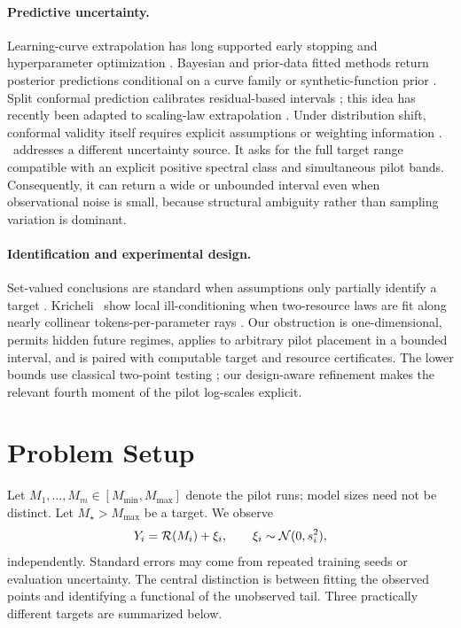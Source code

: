 \paragraph{Predictive uncertainty.}
Learning-curve extrapolation has long supported early stopping and hyperparameter optimization \citep{domhan2015speeding,klein2017fast}. Bayesian and prior-data fitted methods return posterior predictions conditional on a curve family or synthetic-function prior \citep{adriaensen2023efficient,lee2025bayesian}. Split conformal prediction calibrates residual-based intervals \citep{romano2019conformalized}; this idea has recently been adapted to scaling-law extrapolation \citep{bukkapatnam2026conformalized}. Under distribution shift, conformal validity itself requires explicit assumptions or weighting information \citep{tibshirani2019covariate}. \ScaleCert\ addresses a different uncertainty source. It asks for the full target range compatible with an explicit positive spectral class and simultaneous pilot bands. Consequently, it can return a wide or unbounded interval even when observational noise is small, because structural ambiguity rather than sampling variation is dominant.

\paragraph{Identification and experimental design.}
Set-valued conclusions are standard when assumptions only partially identify a target \citep{manski2003partial}. Kricheli \etal\ show local ill-conditioning when two-resource laws are fit along nearly collinear tokens-per-parameter rays \citep{kricheli2026coverage}. Our obstruction is one-dimensional, permits hidden future regimes, applies to arbitrary pilot placement in a bounded interval, and is paired with computable target and resource certificates. The lower bounds use classical two-point testing \citep{tsybakov2009introduction}; our design-aware refinement makes the relevant fourth moment of the pilot log-scales explicit.

\section{Problem Setup}

Let $M_1,\ldots,M_m\in[M_{\min},M_{\max}]$ denote the pilot runs; model sizes need not be distinct. Let $M_\star>M_{\max}$ be a target. We observe
\begin{equation}
  Y_i=\mathcal{R}(M_i)+\xi_i,\qquad \xi_i\sim\mathcal{N}(0,s_i^2),
  \label{eq:observations}
\end{equation}
independently. Standard errors may come from repeated training seeds or evaluation uncertainty. The central distinction is between fitting the observed points and identifying a functional of the unobserved tail. Three practically different targets are summarized below.

